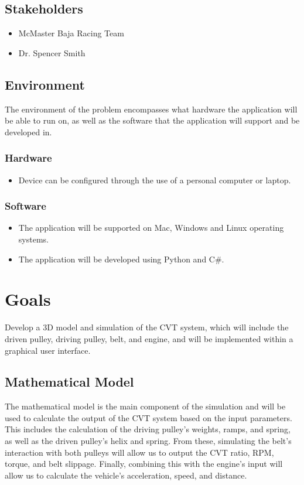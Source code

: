\documentclass{article}
\begin{document}
\subsection{Stakeholders}
\begin{itemize}
    \item McMaster Baja Racing Team
    \item Dr. Spencer Smith
\end{itemize}

\subsection{Environment}
The environment of the problem encompasses what hardware the application will be able to run on,
as well as the software that the application will support and be developed in.

\subsubsection{Hardware}
\begin{itemize}
    \item Device can be configured through the use of a personal computer or laptop.
\end{itemize}
    \subsubsection{Software}
\begin{itemize}
    \item The application will be supported on Mac, Windows and Linux operating
    systems.
    \item The application will be developed using Python and C\#.
\end{itemize}

\section{Goals}

Develop a 3D model and simulation of the CVT system, which will include the driven pulley, 
driving pulley, belt, and engine, and will be implemented within a graphical user interface.

\subsection{Mathematical Model}
The mathematical model is the main component of the simulation and will be used to 
calculate the output of the CVT system based on the input parameters.
This includes the calculation of the driving pulley's weights, ramps, and spring, 
as well as the driven pulley's helix and spring.
From these, simulating the belt's interaction with both pulleys will allow us to output 
the CVT ratio, RPM, torque, and belt slippage. Finally, combining this with the engine's input
will allow us to calculate the vehicle's acceleration, speed, and distance.
\end{document}
